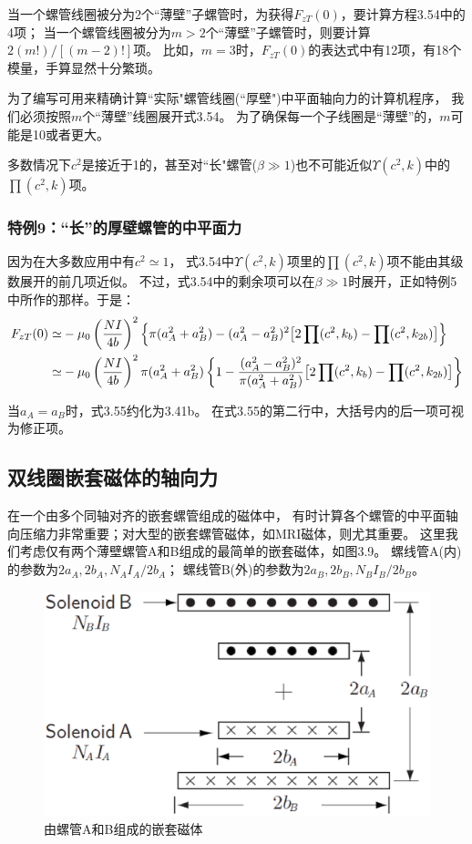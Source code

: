 当一个螺管线圈被分为2个``薄壁''子螺管时，为获得$F_{zT}(0)$，要计算方程3.54中的4项；
当一个螺管线圈被分为$m>2$个``薄壁''子螺管时，则要计算$2(m!)/[(m−2)!]$项。
比如，$m=3$时，$F_{zT}(0)$的表达式中有12项，有18个模量，手算显然十分繁琐。

为了编写可用来精确计算``实际"螺管线圈(``厚壁")中平面轴向力的计算机程序，
我们必须按照$m$个``薄壁''线圈展开式3.54。
为了确保每一个子线圈是``薄壁''的，$m$可能是10或者更大。

多数情况下$c^2$是接近于1的，甚至对``长"螺管($\beta\gg 1$)也不可能近似$\Upsilon(c^2,k)$中的$\prod(c^2,k)$项。

\subsubsection{特例9：``长''的厚壁螺管的中平面力}
因为在大多数应用中有$c^2\simeq 1$，
式3.54中$\Upsilon(c^2,k)$项里的$\prod{(c^2,k)}$项不能由其级数展开的前几项近似。
不过，式3.54中的剩余项可以在$\beta \gg 1$时展开，正如特例5中所作的那样。于是：
\begin{align}
F_{zT}(0)\simeq& -\mu_0 \left(\frac{N I}{4b}\right)^2\left\{ \pi(a_A^2+a_B^2)-(a_A^2-a_B^2)^2\big[2\prod(c^2,k_b)-\prod(c^2,k_{2b})\big]\right\}  \\\notag
\simeq& -\mu_0 \left(\frac{N I}{4b}\right)^2 \pi(a_A^2+a_B^2) \left\{1-\frac{(a_A^2-a_B^2)^2}{\pi(a_A^2+a_B^2)}\big[2\prod(c^2,k_b)-\prod(c^2,k_{2b})\big]\right\}
\end{align}

当$a_A=a_B$时，式3.55约化为3.41b。
在式3.55的第二行中，大括号内的后一项可视为修正项。

\subsection{双线圈嵌套磁体的轴向力}
在一个由多个同轴对齐的嵌套螺管组成的磁体中，
有时计算各个螺管的中平面轴向压缩力非常重要；对大型的嵌套螺管磁体，如MRI磁体，则尤其重要。
这里我们考虑仅有两个薄壁螺管A和B组成的最简单的嵌套磁体，如图3.9。
螺线管A(内)的参数为$2a_A,2b_A,N_A I_A/2b_A$；
螺线管B(外)的参数为$2a_B, 2b_B, N_B I_B/2b_B$。

\begin{figure}[htbp]
  \centering
 \includegraphics[scale=0.4]{chpt3/figs/fig3.9.eps}
  \caption{由螺管A和B组成的嵌套磁体}
\end{figure}

